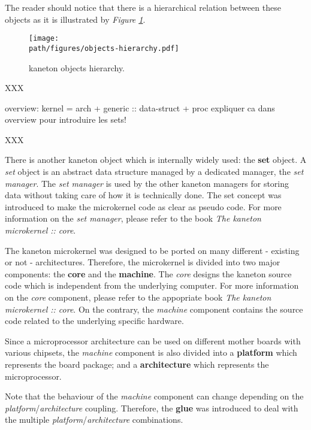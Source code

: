 The reader should notice that there is a hierarchical relation between
these objects as it is illustrated by \textit{Figure
\ref{figure:objects-hierarchy}}.

\begin{figure}[h]
  \begin{center}
    \texttt{[image: \\path/figures/objects-hierarchy.pdf]}
    \caption{kaneton objects hierarchy.}
    \label{figure:objects-hierarchy}
  \end{center}
\end{figure}

XXX

overview: kernel = arch + generic :: data-struct + proc
expliquer ca dans overview pour introduire les sets!

XXX

There is another kaneton object which is internally widely used: the
\textbf{set} object. A \textit{set} object is an abstract data structure
managed by a dedicated manager, the \textit{set manager}. The \textit{set
manager} is used by the other kaneton managers for storing data without taking
care of how it is technically done. The set concept was introduced to make the
microkernel code as clear as pseudo code. For more information on the
\textit{set manager}, please refer to the book \textit{The kaneton
microkernel :: core}.

The kaneton microkernel was designed to be ported on many different - existing
or not - architectures. Therefore, the microkernel is divided into two
major components: the \textbf{core} and the \textbf{machine}. The \textit{core}
designs the kaneton source code which is independent from the underlying
computer. For more information on the \textit{core} component, please refer
to the appopriate book \textit{The kaneton microkernel :: core}. On the
contrary, the \textit{machine} component contains the source code related to
the underlying specific hardware.

Since a microprocessor architecture can be used on different mother boards
with various chipsets, the \textit{machine} component is also divided into
a \textbf{platform} which represents the board package; and a
\textbf{architecture} which represents the microprocessor.

Note that the behaviour of the \textit{machine} component can change depending
on the \textit{platform}/\textit{architecture} coupling. Therefore, the
\textbf{glue} was introduced to deal with the multiple
\textit{platform}/\textit{architecture} combinations.

